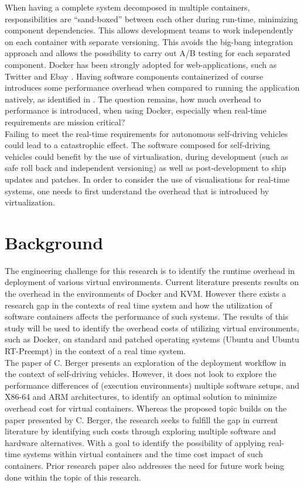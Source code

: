 When having a complete system decomposed in multiple containers, responsibilities are “sand-boxed” between each other during run-time, minimizing component dependencies. This allows development teams to work independently on each container with separate versioning. This avoids the big-bang integration approach and allows the possibility to carry out A/B testing for each separated component. Docker has been strongly adopted for web-applications, such as Twitter and Ebay \cite{7034713}. Having software components containerized of course introduces some performance overhead when compared to running the application natively, as identified in \cite{7034713}. The question remains, how much overhead to performance is introduced, when using Docker, especially when real-time requirements are mission critical?\\

Failing to meet the real-time requirements for autonomous self-driving vehicles could lead to a catastrophic effect. The software composed for self-driving vehicles could benefit by the use of virtualisation, during development (such as safe roll back and independent versioning) as well as post-development to ship updates and patches. In order to consider the use of visualisations for real-time systems, one needs to first understand the overhead that is introduced by virtualization.\\

\section{Background}

The engineering challenge for this research is to identify the runtime overhead in deployment of various virtual environments. Current literature \cite{vmvscontainers} presents results on the overhead in the environments of Docker and KVM. However there exists a research gap in the contexts of real time system and how the utilization of software containers affects the performance of such systems. The results of this study will be used to identify the overhead costs of utilizing virtual environments, such as Docker, on standard and patched operating systems (Ubuntu and Ubuntu RT-Preempt) in the context of a real time system.\\

The paper of C. Berger \cite{cberger} presents an exploration of the deployment workflow in the context of self-driving vehicles. However, it does not look to explore the performance differences of (execution environments) multiple software setups, and X86-64 and ARM architectures, to identify an optimal solution to minimize overhead cost for virtual containers. Whereas the proposed topic builds on the paper presented by C. Berger, the research seeks to fulfill the gap in current literature by identifying such costs through exploring multiple software and hardware alternatives. With a goal to identify the possibility of applying real-time systems within virtual containers and the time cost impact of such containers. Prior research paper \cite{cberger} also addresses the need for future work being done within the topic of this research.\\

